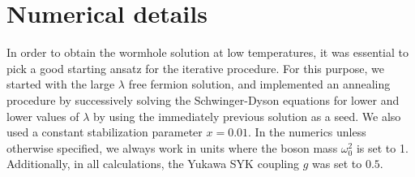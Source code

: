 \section{Numerical details}
\label{app:numericaldetails}
In order to obtain the wormhole solution at low temperatures, it was essential to pick a good starting ansatz for the iterative procedure. For this purpose, we started with the large $\lambda$ free fermion solution, and implemented an annealing procedure by successively solving the Schwinger-Dyson equations for lower and lower values of $\lambda$ by using the immediately previous solution as a seed. We also used a constant stabilization parameter $x=0.01$. In the numerics unless otherwise specified, we always work in units where the boson mass $\omega_0^2$ is set to 1. Additionally, in all calculations, the Yukawa SYK coupling $g$ was set to $0.5$.  




